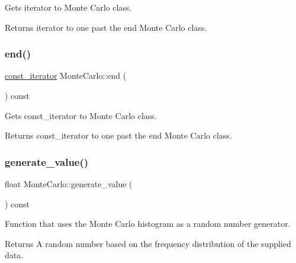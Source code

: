 Gets iterator to Monte Carlo class. \begin{DoxyReturn}{Returns}
iterator to one past the end Monte Carlo class. 
\end{DoxyReturn}
\mbox{\label{classMonteCarlo_a6e15e3a5a96163b8cc84ec9892c2e88b}} 
\subsubsection{\texorpdfstring{end()}{end()}\hspace{0.1cm}{\footnotesize\ttfamily [2/2]}}
{\footnotesize\ttfamily \hyperlink{classMonteCarlo_a74dc0884e3b02002956de4fb84a0bb01}{const\+\_\+iterator} Monte\+Carlo\+::end (\begin{DoxyParamCaption}{ }\end{DoxyParamCaption}) const\hspace{0.3cm}{\ttfamily [inline]}}

Gets const\+\_\+iterator to Monte Carlo class. \begin{DoxyReturn}{Returns}
const\+\_\+iterator to one past the end Monte Carlo class. 
\end{DoxyReturn}
\mbox{\label{classMonteCarlo_ac66e8e496c2790a58440cfa879587be6}} 
\subsubsection{\texorpdfstring{generate\+\_\+value()}{generate\_value()}}
{\footnotesize\ttfamily float Monte\+Carlo\+::generate\+\_\+value (\begin{DoxyParamCaption}{ }\end{DoxyParamCaption}) const}

Function that uses the Monte Carlo histogram as a random number generator. \begin{DoxyReturn}{Returns}
A random number based on the frequency distribution of the supplied data. 
\end{DoxyReturn}
\mbox{\label{classMonteCarlo_a422c7392cf26796d756b347a4d97a522}} 
